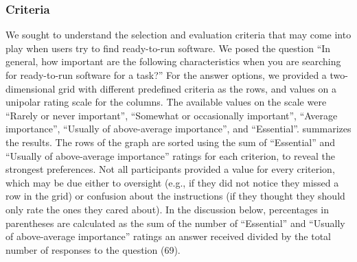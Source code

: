\documentclass{casicswhitepaper}
\newcommand{\totalRespondents}{69\xspace}
\begin{document}
\subsubsection{Criteria}
\label{criteria-ready-to-use}

We sought to understand the selection and evaluation criteria that may come into play when users try to find ready-to-run software.  We posed the question ``In general, how important are the following characteristics when you are searching for ready-to-run software for a task?''  For the answer options, we provided a two-dimensional grid with different predefined criteria as the rows, and values on a unipolar rating scale for the columns.  The available values on the scale were ``Rarely or never important'', ``Somewhat or occasionally important'', ``Average importance'', ``Usually of above-average importance'', and ``Essential''.  summarizes the results.  The rows of the graph are sorted using the sum of ``Essential'' and ``Usually of above-average importance'' ratings for each criterion, to reveal the strongest preferences.  Not all participants provided a value for every criterion, which may be due either to oversight (e.g., if they did not notice they missed a row in the grid) or confusion about the instructions (if they thought they should only rate the ones they cared about).  In the discussion below, percentages in parentheses are calculated as the sum of the number of ``Essential'' and ``Usually of above-average importance'' ratings an answer received divided by the total number of responses to the question (\totalRespondents).
\end{document}
